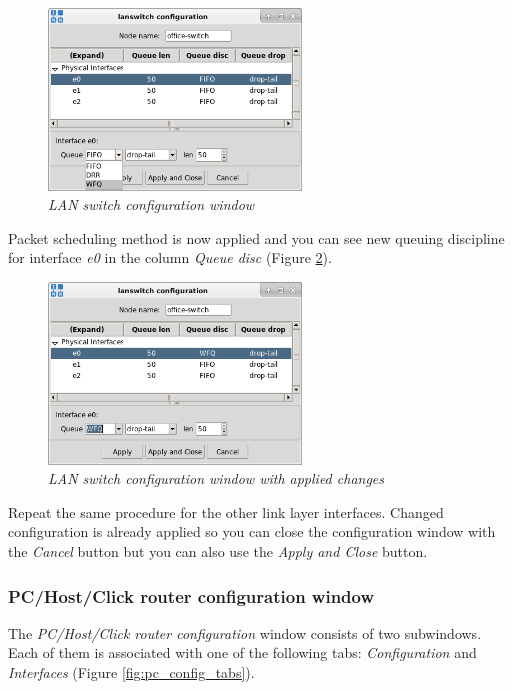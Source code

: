 \begin{figure}[H]
\centering
\vspace{10pt}
\includegraphics[width=0.6\textwidth]{./images/LANswitch_config.png}
\caption{\emph{LAN switch configuration window}}
\label{fig:LANswitch_config}
\end{figure}

Packet scheduling method is now applied and you can see new queuing discipline
for interface \emph{e0} in the column \emph{Queue disc} (Figure
\ref{fig:LANswitch_config_applied}). 

\begin{figure}[H]
\centering
\vspace{10pt}
\includegraphics[width=0.6\textwidth]{./images/LANswitch_config_applied.png}
\caption{\emph{LAN switch configuration window with applied changes}}
\label{fig:LANswitch_config_applied}
\end{figure}

Repeat the same procedure for the other link layer interfaces.
Changed configuration is already applied so you can close the configuration
window with the \emph{Cancel} button but you can also use the \emph{Apply and
Close} button.

\subsubsection{PC/Host/Click router configuration window}
The \emph{PC/Host/Click router configuration} window consists of two
subwindows. Each of them is associated with one of the following tabs:
\emph{Configuration} and \emph{Interfaces} (Figure \ref{fig:pc_config_tabs}).

